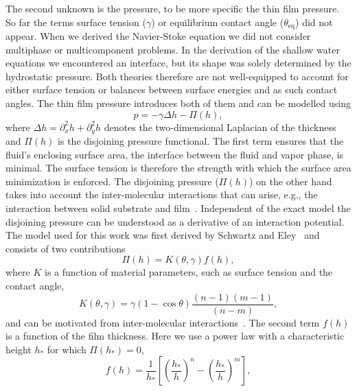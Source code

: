 The second unknown is the pressure, to be more specific the thin film pressure.
So far the terms surface tension ($\gamma$) or equilibrium contact angle ($\theta_{\text{eq}}$) did not appear.
When we derived the Navier-Stoke equation we did not consider multiphase or multicomponent problems. 
In the derivation of the shallow water equations we encountered an interface, but its shape was solely determined by the hydrostatic pressure.
Both theories therefore are not well-equipped to account for either surface tension or balances between surface energies and as such contact angles.
The thin film pressure introduces both of them and can be modelled using
\begin{equation}\label{eq:thin_film_pressure}
    p = -\gamma \Delta h - \Pi(h),
\end{equation}
where $\Delta h = \partial_x^2 h + \partial_y^2 h$ denotes the two-dimensional Laplacian of the thickness and $\Pi(h)$ is the disjoining pressure functional.
The first term ensures that the fluid's enclosing surface area, the interface between the fluid and vapor phase, is minimal.
The surface tension is therefore the strength with which the surface area minimization is enforced.
The disjoining pressure ($\Pi(h)$) on the other hand takes into account the inter-molecular interactions that can arise, e.g., the interaction between solid substrate and film~\cite{crasterDynamicsStabilityThin2009, moultonEffectDisjoiningPressure2013}.
Independent of the exact model the disjoining pressure can be understood as a derivative of an interaction potential.
The model used for this work was first derived by Schwartz and Eley~\cite{schwartzSimulationDropletMotion1998} and consists of two contributions
\begin{equation}\label{eq:disj_pressure_one}
    \Pi(h) = K(\theta, \gamma) f(h),
\end{equation}
where $K$ is a function of material parameters, such as surface tension and the contact angle, 
\begin{equation}\label{eq:disj_kappa}
    K(\theta, \gamma) = \gamma (1 - \cos\theta) \frac{(n-1)(m-1)}{(n-m)},
\end{equation}
and can be motivated from inter-molecular interactions~\cite{mahadyVolumeFluidMethod2015}.
The second term $f(h)$ is a function of the film thickness.
Here we use a power law with a characteristic height $h_{\ast}$ for which $\Pi(h_{\ast}) = 0$,
\begin{equation}\label{eq:disj_fofh}
    f(h) = \frac{1}{h_{\ast}}\left[\left(\frac{h_{\ast}}{h}\right)^n - \left(\frac{h_{\ast}}{h}\right)^m \right],
\end{equation}
